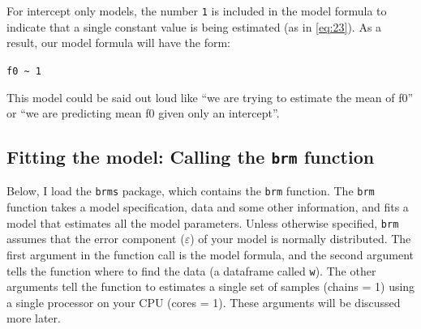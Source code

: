 \documentclass[
]{book}
\begin{document}
For intercept only models, the number \texttt{1} is included in the model formula to indicate that a single constant value is being estimated (as in \eqref{eq:23}). As a result, our model formula will have the form:

\texttt{f0\ \textasciitilde{}\ 1}

This model could be said out loud like ``we are trying to estimate the mean of f0'' or ``we are predicting mean f0 given only an intercept''.

\hypertarget{fitting-the-model-calling-the-brm-function}{%
\subsection{\texorpdfstring{Fitting the model: Calling the \texttt{brm} function}{Fitting the model: Calling the brm function}}\label{fitting-the-model-calling-the-brm-function}}

Below, I load the \texttt{brms} package, which contains the \texttt{brm} function. The \texttt{brm} function takes a model specification, data and some other information, and fits a model that estimates all the model parameters. Unless otherwise specified, \texttt{brm} assumes that the error component (\(\varepsilon\)) of your model is normally distributed. The first argument in the function call is the model formula, and the second argument tells the function where to find the data (a dataframe called \texttt{w}). The other arguments tell the function to estimates a single set of samples (chains = 1) using a single processor on your CPU (cores = 1). These arguments will be discussed more later.
\end{document}

